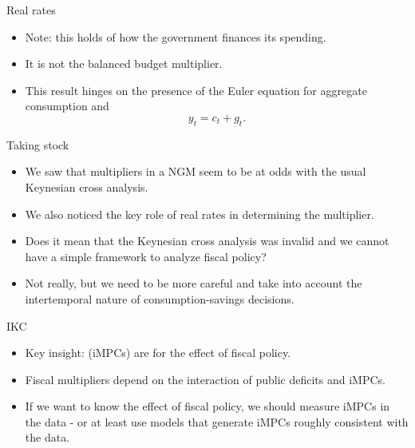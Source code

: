 \documentclass[11pt,xcolor={dvipsnames},aspectratio=159,hyperref={pdftex,pdfpagemode=UseNone,hidelinks,pdfdisplaydoctitle=true},usepdftitle=false]{beamer}
\begin{document}
\begin{frame}{Real rates}
    \begin{itemize}
    \item Note: this holds  of how the government finances its spending.
    \item It is not the balanced budget multiplier. 
    \item This result hinges on the presence of the Euler equation for aggregate consumption and $$y_t = c_t + g_t.$$
    \end{itemize}
\end{frame}      

\begin{frame}{Taking stock}
    \begin{itemize}
    \item We saw that multipliers in a NGM seem to be at odds with the usual Keynesian cross analysis.
    \item We also noticed the key role of real rates in determining the multiplier.
    \item Does it mean that the Keynesian cross analysis was invalid and we cannot have a simple framework to analyze fiscal policy?
    \item Not really, but we need to be more careful and take into account the intertemporal nature of consumption-savings decisions. 
    \end{itemize}
\end{frame}      

\begin{frame}
        \end{frame}

  

\begin{frame}{IKC}
    \begin{itemize}
        \item Key insight:  (iMPCs) are  for the effect of fiscal policy.
        \item Fiscal multipliers depend on the interaction of public deficits and iMPCs.
        \item If we want to know the effect of fiscal policy, we should measure iMPCs in the data - or at least use models that generate iMPCs roughly consistent with the data.
    \end{itemize}
    
\end{frame}
\end{document}
